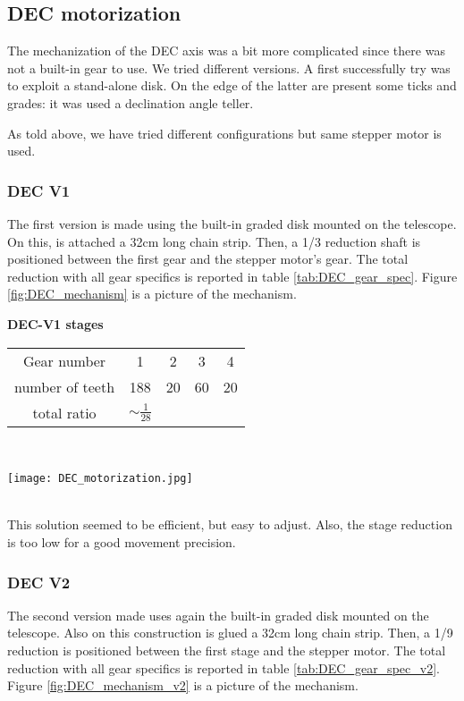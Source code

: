 \subsection{DEC motorization}
The mechanization of the DEC axis was a bit more complicated since there was not a built-in gear to use.
We tried different versions.
A first successfully try was to exploit a stand-alone disk.
On the edge of the latter are present some ticks and grades: it was used a declination angle teller.

As told above, we have tried different configurations but same stepper motor is used.

\subsubsection{DEC V1}
The first version is made using the built-in graded disk mounted on the telescope.
On this, is attached a 32cm long chain strip.
Then, a 1/3 reduction shaft is positioned between the first gear and the stepper motor's gear.
The total reduction with all gear specifics is reported in table \ref{tab:DEC_gear_spec}.
Figure \ref{fig:DEC_mechanism} is a picture of the mechanism.

\begin{minipage}
    {0.5\textwidth}
    \centering
    \textbf{DEC-V1 stages}\\
    \begin{tabular}{ccccc}
        \hline
        Gear number & 1 & 2 & 3 & 4 \\
        number of teeth & 188 & 20 & 60 & 20 \\
        \hline
        total ratio & \(\sim \frac{1}{28}\) &&&
    \end{tabular}
    \label{tab:DEC_gear_spec}
\end{minipage}
\\
\begin{minipage}
    {0.5\textwidth}
    \centering
    \texttt{[image: DEC\_motorization.jpg]}
    \label{fig:DEC_mechanism}
\end{minipage}
\\
This solution seemed to be efficient, but easy to adjust.
Also, the stage reduction is too low for a good movement precision.

\subsubsection{DEC V2}
The second version made uses again the built-in graded disk mounted on the telescope.
Also on this construction is glued a 32cm long chain strip.
Then, a 1/9 reduction is positioned between the first stage and the stepper motor.
The total reduction with all gear specifics is reported in table \ref{tab:DEC_gear_spec_v2}.
Figure \ref{fig:DEC_mechanism_v2} is a picture of the mechanism.

